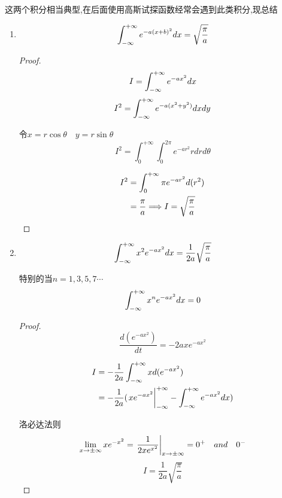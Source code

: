 \documentclass{article}
\begin{document}
        
        \begin{formal}
        这两个积分相当典型,在后面使用高斯试探函数经常会遇到此类积分,现总结
        

        \begin{enumerate}
            \item 
                $$ \int_{-\infty}^{+\infty} e^{-a (x+b)^{2}} dx = \sqrt{\frac{\pi}{a}} $$
            \begin{proof}
                \pfindent 

                $$I=\int_{-\infty}^{+\infty} e^{-a x^{2}} dx$$
                $$I^{2}= \int_{-\infty}^{+\infty} e^{-a (x^{2}+y^{2})} dx dy $$

                令$x=r\cos{\theta} \quad y=r\sin{\theta}$
                $$ I^{2} = \int_{0}^{+\infty} \int_{0}^{2\pi} e^{-a r^{2}} rdrd\theta $$
               
                \begin{align*}
                    I^{2} &= \int_{0}^{+\infty} \pi  e^{-a r^{2}}d(r^{2})   \\
                          &= \frac{\pi}{a}  \Longrightarrow I = \sqrt{\frac{\pi}{a}} 
                \end{align*}
            
            \end{proof}

            \item 
                $$ \int_{-\infty}^{+\infty} x^{2} e^{-a x^{2}} dx = \frac{1}{2a} \sqrt{\frac{\pi}{a}} $$

                特别的当$n=1,3,5,7\cdots$
                $$ \int_{-\infty}^{+\infty} x^{n} e^{-a x^{2}} dx = 0 $$

                \begin{proof}
                    \pfindent
                    $$ \frac{d(e^{-a x^{2}})}{dt} = -2a x e^{-a x^{2}} $$
                    
                    \begin{align*}
                        I &= -\frac{1}{2a} \intff x d(e^{-a x^{2}})                                         \\
                          &= -\frac{1}{2a} (\eval{x e^{-a x^{2}}}_{-\infty}^{+\infty} - \intff e^{-a x^{2}}dx )
                    \end{align*}

                    洛必达法则
                    $$ \lim_{x \to \pm \infty} x e^{-x^{2}} = \eval{\frac{1}{2x e^{x^{2}}}}_{x \to \pm \infty} = 0^{+} \quad and \quad 0^{-} $$ 
                    $$ I = \frac{1}{2a} \sqrt{\frac{\pi}{a}}$$


\end{proof}
\end{enumerate}
\end{formal}
\end{document}
